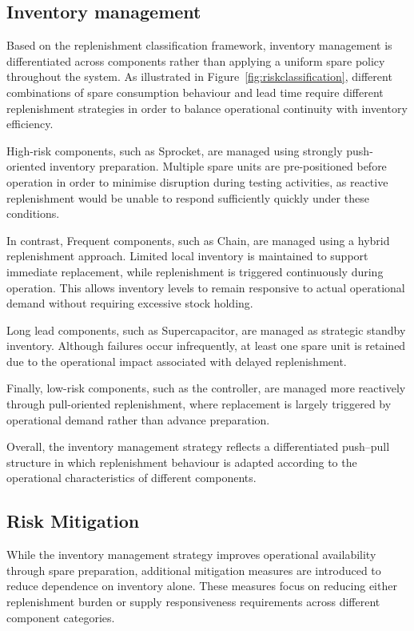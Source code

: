 \documentclass[11pt, a4paper]{report}
\numberwithin{equation}{section}
\begin{document}
\begin{refsection}
\subsection{Inventory management}
\label{sec:inventory_management}

Based on the replenishment classification framework, inventory management is differentiated across components rather than applying a uniform spare policy throughout the system. As illustrated in Figure~\ref{fig:riskclassification}, different combinations of spare consumption behaviour and lead time require different replenishment strategies in order to balance operational continuity with inventory efficiency.

High-risk components, such as Sprocket, are managed using strongly push-oriented inventory preparation. Multiple spare units are pre-positioned before operation in order to minimise disruption during testing activities, as reactive replenishment would be unable to respond sufficiently quickly under these conditions.

In contrast, Frequent components, such as Chain, are managed using a hybrid replenishment approach. Limited local inventory is maintained to support immediate replacement, while replenishment is triggered continuously during operation. This allows inventory levels to remain responsive to actual operational demand without requiring excessive stock holding.

Long lead components, such as Supercapacitor, are managed as strategic standby inventory. Although failures occur infrequently, at least one spare unit is retained due to the operational impact associated with delayed replenishment.

Finally, low-risk components, such as the controller, are managed more reactively through pull-oriented replenishment, where replacement is largely triggered by operational demand rather than advance preparation.

Overall, the inventory management strategy reflects a differentiated push--pull structure in which replenishment behaviour is adapted according to the operational characteristics of different components.

\subsection{Risk Mitigation}

While the inventory management strategy improves operational availability through spare preparation, additional mitigation measures are introduced to reduce dependence on inventory alone. These measures focus on reducing either replenishment burden or supply responsiveness requirements across different component categories.


\end{refsection}
\end{document}
